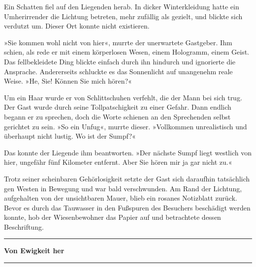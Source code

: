 Ein Schatten fiel auf den Liegenden herab. In dicker Winterkleidung hatte ein Umherirrender die Lichtung betreten, mehr zufällig als gezielt, und blickte sich verdutzt um. Dieser Ort konnte nicht existieren.

»Sie kommen wohl nicht von hier«, murrte der unerwartete Gastgeber. Ihm schien, als rede er mit einem körperlosen Wesen, einem Hologramm, einem Geist. Das fellbekleidete Ding blickte einfach durch ihn hindurch und ignorierte die Ansprache. Andererseits schluckte es das Sonnenlicht auf unangenehm reale Weise. »He, Sie! Können Sie mich hören?«

Um ein Haar wurde er von Schlittschuhen verfehlt, die der Mann bei sich trug. Der Gast wurde durch seine Tollpatschigkeit zu einer Gefahr. Dann endlich begann er zu sprechen, doch die Worte schienen an den Sprechenden selbst gerichtet zu sein. »So ein Unfug«, murrte dieser. »Vollkommen unrealistisch und überhaupt nicht lustig. Wo ist der Sumpf?«

Das konnte der Liegende ihm beantworten. »Der nächste Sumpf liegt westlich von hier, ungefähr fünf Kilometer entfernt. Aber Sie hören mir ja gar nicht zu.«

Trotz seiner scheinbaren Gehörlosigkeit setzte der Gast sich daraufhin tatsächlich gen Westen in Bewegung und war bald verschwunden. Am Rand der Lichtung, aufgehalten von der unsichtbaren Mauer, blieb ein rosanes Notizblatt zurück. Bevor es durch das Tauwasser in den Fußspuren des Besuchers beschädigt werden konnte, hob der Wiesenbewohner das Papier auf und betrachtete dessen Beschriftung.

\noindent \parbox{\textwidth}{ \vspace{3ex} \hrule \vspace{3ex}

\textbf{Von Ewigkeit her}


\vspace{3ex} \hrule \vspace{3ex} }


